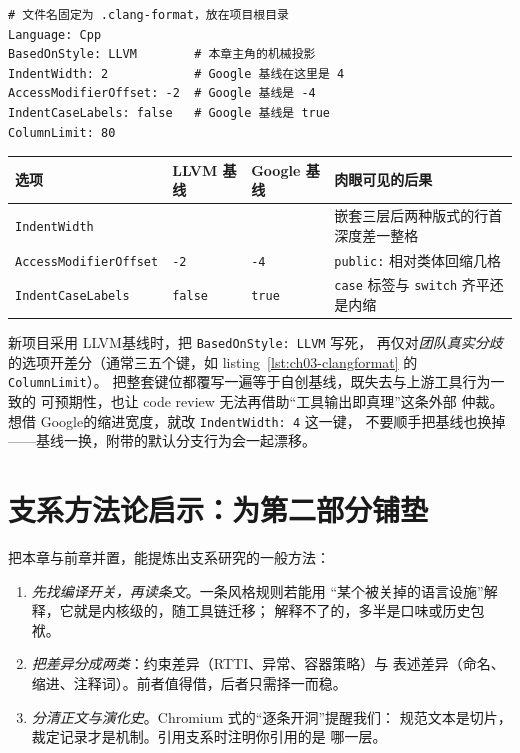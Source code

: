 \documentclass[12pt,a4paper,fontset=fandol]{ctexbook}
\newcommand{\Tp}[1]{\texttt{#1}}
\newcommand{\Lang}[1]{\textsf{#1}}
\newcommand{\DomGo}{\Lang{Google}}
\newcommand{\DomLlvm}{\Lang{LLVM}}
\begin{document}
\begin{lstlisting}[style=yamlstyle,caption={项目根目录 \Tp{.clang-format} 的最小示例},label={lst:ch03-clangformat}]
# 文件名固定为 .clang-format，放在项目根目录
Language: Cpp
BasedOnStyle: LLVM        # 本章主角的机械投影
IndentWidth: 2            # Google 基线在这里是 4
AccessModifierOffset: -2  # Google 基线是 -4
IndentCaseLabels: false   # Google 基线是 true
ColumnLimit: 80
\end{lstlisting}

{\small
\begin{longtable}{>{\raggedright\arraybackslash}p{} >{\raggedright\arraybackslash}p{} >{\raggedright\arraybackslash}p{} >{\raggedright\arraybackslash}p{}}
\toprule
选项 & LLVM 基线 & Google 基线 & 肉眼可见的后果 \\
\midrule
\Tp{IndentWidth} & 2 & 4 & 嵌套三层后两种版式的行首深度差一整格 \\
\Tp{Access\allowbreak Modifier\allowbreak Offset} & \Tp{-2} & \Tp{-4} & \Tp{public:} 相对类体回缩几格 \\
\Tp{Indent\allowbreak CaseLabels} & \Tp{false} & \Tp{true} & \Tp{case} 标签与 \Tp{switch} 齐平还是内缩 \\
\bottomrule
\end{longtable}}

\begin{bestpractice}[title={以基线起家，用差分表达立场}]
新项目采用 \DomLlvm 基线时，把 \Tp{BasedOnStyle: LLVM} 写死，
再仅对\emph{团队真实分歧}的选项开差分（通常三五个键，如
listing~\ref{lst:ch03-clangformat} 的 \Tp{ColumnLimit}）。
把整套键位都覆写一遍等于自创基线，既失去与上游工具行为一致的
可预期性，也让 code review 无法再借助``工具输出即真理''这条外部
仲裁。想借 \DomGo 的缩进宽度，就改 \Tp{IndentWidth: 4} 这一键，
不要顺手把基线也换掉——基线一换，附带的默认分支行为会一起漂移。
\end{bestpractice}

\section{支系方法论启示：为第二部分铺垫}
\label{sec:ch03-method}

把本章与前章并置，能提炼出支系研究的一般方法：

\begin{enumerate}
  \item \emph{先找编译开关，再读条文}。一条风格规则若能用
        ``某个被关掉的语言设施''解释，它就是内核级的，随工具链迁移；
        解释不了的，多半是口味或历史包袱。
  \item \emph{把差异分成两类}：约束差异（RTTI、异常、容器策略）与
        表述差异（命名、缩进、注释词）。前者值得借，后者只需择一而稳。
  \item \emph{分清正文与演化史}。Chromium 式的``逐条开洞''提醒我们：
        规范文本是切片，裁定记录才是机制。引用支系时注明你引用的是
        哪一层。
\end{enumerate}
\end{document}
